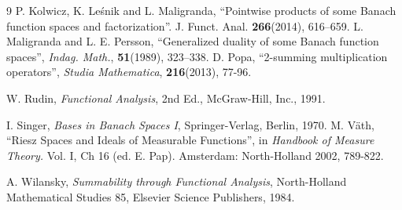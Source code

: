 \documentclass[14pt, a4paper]{article}  %
\begin{document}
\begin{thebibliography}{9}
  P. Kolwicz, K. Le\'{s}nik and L. Maligranda, ``Pointwise products of some Banach
 function spaces and factorization''. J. Funct. Anal. \textbf{266}(2014), 616–659. 
% 
% 
% 
% 
% 
% 
  L. Maligranda and L. E. Persson, ``Generalized duality of some Banach function spaces'', \emph{Indag. Math.}, \textbf{51}(1989), 323–338.  
% 
% 
% 
% 
% 
  D. Popa, ``2-summing multiplication operators'', \emph{Studia Mathematica}, \textbf{216}(2013), 77-96. 
 
  W. Rudin, \emph{Functional Analysis},  2nd Ed., McGraw-Hill, Inc., 1991.
 
  I. Singer, \emph{Bases in Banach Spaces I}, Springer-Verlag, Berlin, 1970.
% 
% 
% 
  M. Väth, ``Riesz Spaces and Ideals of Measurable Functions'', in \emph{Handbook of Measure Theory.} Vol. I, Ch 16 (ed. E. Pap). Amsterdam: North-Holland 2002,  789-822.
 
% 
  A. Wilansky, \emph{Summability through
 	Functional Analysis}, North-Holland Mathematical Studies 85, Elsevier Science Publishers,   1984.
% 
% 


% 
% 
% 
% 
 \end{thebibliography} 
	 
\end{document}
